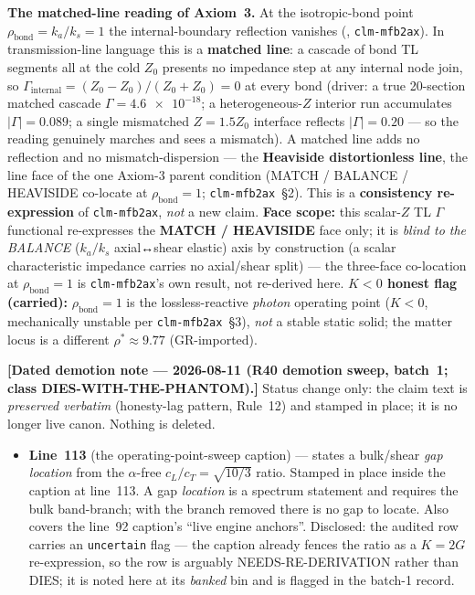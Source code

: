 \medskip\noindent\textbf{The matched-line reading of Axiom~3.} At the isotropic-bond point $\rho_{\mathrm{bond}}=k_a/k_s=1$ the internal-boundary reflection vanishes (, \texttt{clm-mfb2ax}). In transmission-line language this is a \textbf{matched line}: a cascade of bond TL segments all at the cold $Z_0$ presents no impedance step at any internal node join, so $\Gamma_{\mathrm{internal}}=(Z_0-Z_0)/(Z_0+Z_0)=0$ at every bond (driver: a true 20-section matched cascade $\Gamma=\num{4.6e-18}$; a heterogeneous-$Z$ interior run accumulates $|\Gamma|=0.089$; a single mismatched $Z=1.5Z_0$ interface reflects $|\Gamma|=0.20$ --- so the reading genuinely marches and sees a mismatch). A matched line adds no reflection and no mismatch-dispersion --- the \textbf{Heaviside distortionless line}, the line face of the one Axiom-3 parent condition (MATCH / BALANCE / HEAVISIDE co-locate at $\rho_{\mathrm{bond}}=1$; \texttt{clm-mfb2ax}~\S2). This is a \textbf{consistency re-expression} of \texttt{clm-mfb2ax}, \emph{not} a new claim. \textbf{Face scope:} this scalar-$Z$ TL $\Gamma$ functional re-expresses the \textbf{MATCH / HEAVISIDE} face only; it is \emph{blind to the BALANCE} ($k_a/k_s$ axial↔shear elastic) axis by construction (a scalar characteristic impedance carries no axial/shear split) --- the three-face co-location at $\rho_{\mathrm{bond}}=1$ is \texttt{clm-mfb2ax}'s own result, not re-derived here. \textbf{$K<0$ honest flag (carried):} $\rho_{\mathrm{bond}}=1$ is the lossless-reactive \emph{photon} operating point ($K<0$, mechanically unstable per \texttt{clm-mfb2ax}~\S3), \emph{not} a stable static solid; the matter locus is a different $\rho^\ast\approx9.77$ (GR-imported).

\medskip
\noindent\textbf{[Dated demotion note --- 2026-08-11 (R40 demotion sweep, batch~1;
class DIES-WITH-THE-PHANTOM).]} Status change only: the claim text is \emph{preserved
verbatim} (honesty-lag pattern, Rule~12) and stamped in place; it is no longer live canon.
Nothing is deleted.

\begin{itemize}
  \item \textbf{Line~113} (the operating-point-sweep caption) --- states a bulk/shear \emph{gap location} from the $\alpha$-free $c_L/c_T = \sqrt{10/3}$ ratio. Stamped in place inside the caption at line~113. A gap \emph{location} is a spectrum statement and requires the bulk band-branch; with the branch removed there is no gap to locate. Also covers the line~92 caption's ``live engine anchors''. Disclosed: the audited row carries an \texttt{uncertain} flag --- the caption already fences the ratio as a $K = 2G$ re-expression, so the row is arguably NEEDS-RE-DERIVATION rather than DIES; it is noted here at its \emph{banked} bin and is flagged in the batch-1 record.
\end{itemize}

